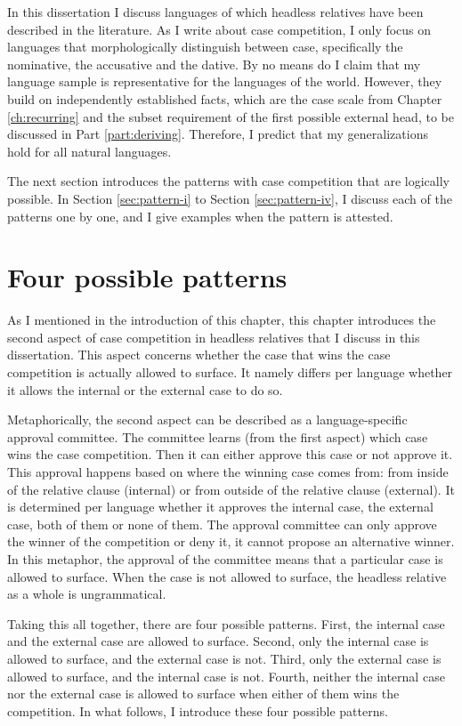 In this dissertation I discuss languages of which headless relatives have been described in the literature. As I write about case competition, I only focus on languages that morphologically distinguish between case, specifically the nominative, the accusative and the dative. By no means do I claim that my language sample is representative for the languages of the world. However, they build on independently established facts, which are the case scale from Chapter \ref{ch:recurring} and the subset requirement of the first possible external head, to be discussed in Part \ref{part:deriving}. Therefore, I predict that my generalizations hold for all natural languages.

The next section introduces the patterns with case competition that are logically possible. In Section \ref{sec:pattern-i} to Section \ref{sec:pattern-iv}, I discuss each of the patterns one by one, and I give examples when the pattern is attested.


\section{Four possible patterns}\label{sec:possible-patterns}

As I mentioned in the introduction of this chapter, this chapter introduces the second aspect of case competition in headless relatives that I discuss in this dissertation. This aspect concerns whether the case that wins the case competition is actually allowed to surface. It namely differs per language whether it allows the internal or the external case to do so.

Metaphorically, the second aspect can be described as a language-specific approval committee. The committee learns (from the first aspect) which case wins the case competition. Then it can either approve this case or not approve it. This approval happens based on where the winning case comes from: from inside of the relative clause (internal) or from outside of the relative clause (external). It is determined per language whether it approves the internal case, the external case, both of them or none of them. The approval committee can only approve the winner of the competition or deny it, it cannot propose an alternative winner. In this metaphor, the approval of the committee means that a particular case is allowed to surface. When the case is not allowed to surface, the headless relative as a whole is ungrammatical.

Taking this all together, there are four possible patterns. First, the internal case and the external case are allowed to surface. Second, only the internal case is allowed to surface, and the external case is not. Third, only the external case is allowed to surface, and the internal case is not. Fourth, neither the internal case nor the external case is allowed to surface when either of them wins the competition. In what follows, I introduce these four possible patterns.

